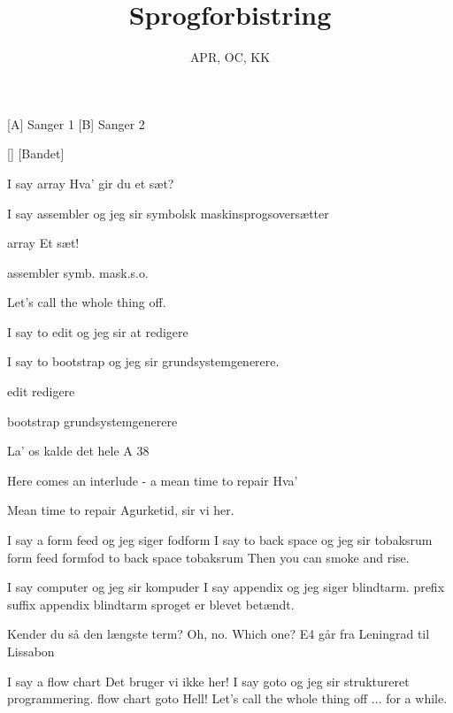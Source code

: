 \documentclass[a4paper,11pt]{article}
\title{Sprogforbistring}
\author{APR, OC, KK}
\begin{document}
\maketitle

\begin{roles}
[A] Sanger 1
[B] Sanger 2
\end{roles}

\begin{props}
[]
[Bandet]
\end{props}

\begin{song}
 I say array
 Hva' gir du et sæt?
 
 I say assembler 
 og jeg sir symbolsk maskinsprogsoversætter

 array
 Et sæt!

 assembler
 symb. mask.s.o.

 Let's call the whole thing off.

 I say to edit
 og jeg sir at redigere

 I say to bootstrap
 og jeg sir grundsystemgenerere.

 edit
 redigere

 bootstrap
 grundsystemgenerere

 La' os kalde det hele A 38

 Here comes an interlude - a mean time to repair
 Hva'

 Mean time to repair
 Agurketid, sir vi her.

 I say a form feed
 og jeg siger fodform
 I say to back space
 og jeg sir tobaksrum
 form feed
 formfod
 to back space
 tobaksrum
 Then you can smoke and rise.

 I say computer
 og jeg sir kompuder
 I say appendix
 og jeg siger blindtarm.
 prefix
 suffix
 appendix
 blindtarm
 sproget er blevet betændt.

 Kender du så den længste term?
 Oh, no. Which one?
 E4 går fra Leningrad til Lissabon

 I say a flow chart
  Det bruger vi ikke her!
 I say goto
 og jeg sir struktureret programmering.
 flow chart
 
 goto
  Hell!
 Let's call the whole thing off ... for a while.


\end{song}
\end{document}
